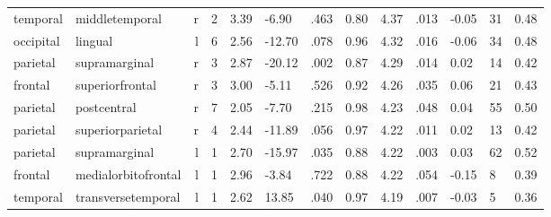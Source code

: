 \documentclass{article}
\begin{document}
\begin{longtable}{llrR{1.3cm}R{1cm}R{1.3cm}R{1cm}R{1cm}R{1.3cm}R{1cm}R{1.8cm}R{1.3cm}R{1.8cm}}
  temporal &            middletemporal &    r &         2 &                  3.39 &            -6.90 &               .463 &                               0.80 &                          4.37 &                            .013 &  -0.05 &     31 &      0.48 \\
 occipital &                   lingual &    l &         6 &                  2.56 &           -12.70 &               .078 &                               0.96 &                          4.32 &                            .016 &  -0.06 &     34 &      0.48 \\
  parietal &             supramarginal &    r &         3 &                  2.87 &           -20.12 &               .002 &                               0.87 &                          4.29 &                            .014 &   0.02 &     14 &      0.42 \\
   frontal &           superiorfrontal &    r &         3 &                  3.00 &            -5.11 &               .526 &                               0.92 &                          4.26 &                            .035 &   0.06 &     21 &      0.43 \\
  parietal &               postcentral &    r &         7 &                  2.05 &            -7.70 &               .215 &                               0.98 &                          4.23 &                            .048 &   0.04 &     55 &      0.50 \\
  parietal &          superiorparietal &    r &         4 &                  2.44 &           -11.89 &               .056 &                               0.97 &                          4.22 &                            .011 &   0.02 &     13 &      0.42 \\
  parietal &             supramarginal &    l &         1 &                  2.70 &           -15.97 &               .035 &                               0.88 &                          4.22 &                            .003 &   0.03 &     62 &      0.52 \\
   frontal &       medialorbitofrontal &    l &         1 &                  2.96 &            -3.84 &               .722 &                               0.88 &                          4.22 &                            .054 &  -0.15 &      8 &      0.39 \\
  temporal &        transversetemporal &    l &         1 &                  2.62 &            13.85 &               .040 &                               0.97 &                          4.19 &                            .007 &  -0.03 &      5 &      0.36 \\

\end{longtable}
\end{document}
